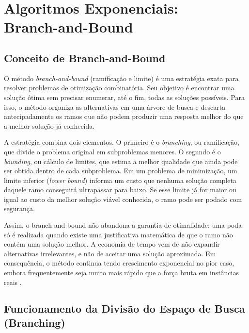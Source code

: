 \chapter[Algoritmos Exponenciais: Branch-and-Bound]{Algoritmos Exponenciais:\\ Branch-and-Bound}

\section{Conceito de Branch-and-Bound}

O método \textit{branch-and-bound} (ramificação e limite) é uma estratégia exata para resolver problemas de otimização combinatória. Seu objetivo é encontrar uma solução ótima sem precisar enumerar, até o fim, todas as soluções possíveis. Para isso, o método organiza as alternativas em uma árvore de busca e descarta antecipadamente os ramos que não podem produzir uma resposta melhor do que a melhor solução já conhecida.

A estratégia combina dois elementos. O primeiro é o \textit{branching}, ou ramificação, que divide o problema original em subproblemas menores. O segundo é o \textit{bounding}, ou cálculo de limites, que estima a melhor qualidade que ainda pode ser obtida dentro de cada subproblema. Em um problema de minimização, um limite inferior (\textit{lower bound}) informa um custo que nenhuma solução completa daquele ramo conseguirá ultrapassar para baixo. Se esse limite já for maior ou igual ao custo da melhor solução viável conhecida, o ramo pode ser podado com segurança.

Assim, o branch-and-bound não abandona a garantia de otimalidade: uma poda só é realizada quando existe uma justificativa matemática de que o ramo não contém uma solução melhor. A economia de tempo vem de não expandir alternativas irrelevantes, e não de aceitar uma solução aproximada. Em consequência, o método continua tendo crescimento exponencial no pior caso, embora frequentemente seja muito mais rápido que a força bruta em instâncias reais \cite{cormen2012,miyazawa_intro}.

\section{Funcionamento da Divisão do Espaço de Busca (Branching)}

